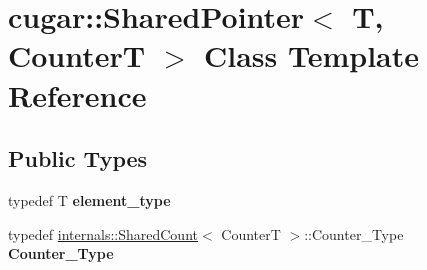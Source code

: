 \hypertarget{classcugar_1_1_shared_pointer}{}\section{cugar\+:\+:Shared\+Pointer$<$ T, CounterT $>$ Class Template Reference}
\label{classcugar_1_1_shared_pointer}
\subsection*{Public Types}
\begin{DoxyCompactItemize}
\item 
\mbox{\label{classcugar_1_1_shared_pointer_a8f3e37213f9d09720091110443287ea8}} 
typedef T {\bfseries element\+\_\+type}
\item 
\mbox{\label{classcugar_1_1_shared_pointer_aca70d3a86f503f7669e8441da4afaba3}} 
typedef \hyperlink{classcugar_1_1internals_1_1_shared_count}{internals\+::\+Shared\+Count}$<$ CounterT $>$\+::Counter\+\_\+\+Type {\bfseries Counter\+\_\+\+Type}
\end{DoxyCompactItemize}

